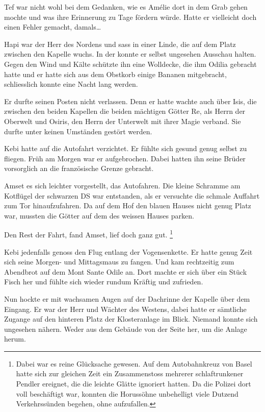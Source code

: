 Tef war nicht wohl bei dem Gedanken, wie es Amélie dort in dem Grab gehen mochte und was ihre Erinnerung zu Tage fördern würde. Hatte er vielleicht doch einen Fehler gemacht, damals\dots 

Hapi war der Herr des Nordens und sass in einer Linde, die auf dem Platz zwischen den Kapelle wuchs. In der konnte er selbst ungesehen Ausschau halten. Gegen den Wind und Kälte schützte ihn eine Wolldecke, die ihm Odilia gebracht hatte und er hatte sich aus dem Obstkorb einige Bananen mitgebracht, schliesslich konnte eine Nacht lang werden.

Er durfte seinen Posten nicht verlassen. Denn er hatte wachte auch über Isis, die zwischen den beiden Kapellen die beiden mächtigen Götter Re, als Herrn der Oberwelt und Osiris, den Herrn der Unterwelt mit ihrer Magie verband. Sie durfte unter keinen Umständen gestört werden.

Kebi hatte auf die Autofahrt verzichtet. Er fühlte sich gesund genug selbst zu fliegen. Früh am Morgen war er aufgebrochen. Dabei hatten ihn seine Brüder vorsorglich an die französische Grenze gebracht. 

Amset es sich leichter vorgestellt, das Autofahren. Die kleine Schramme am Kotflügel der schwarzen DS war entstanden, als er versuchte die schmale Auffahrt zum Tor hinaufzufahren. Da auf dem Hof den blauen Hauses nicht genug Platz war, mussten die Götter auf dem des weissen Hauses parken.

Den Rest der Fahrt, fand Amset, lief doch ganz gut. \footnote{Dabei war es reine Glücksache gewesen. Auf dem Autobahnkreuz von Basel hatte sich zur gleichen Zeit ein Zusammenstoss mehrerer schlaftrunkener Pendler ereignet, die die leichte Glätte ignoriert hatten. Da die Polizei dort voll beschäftigt war, konnten die Horussöhne unbehelligt viele Dutzend Verkehrssünden begehen, ohne aufzufallen.}

Kebi jedenfalls genoss den Flug entlang der Vogensenkette. Er hatte genug Zeit sich seine Morgen- und Mittagsmaus zu fangen. Und kam rechtzeitig zum Abendbrot auf dem Mont Sante Odile an. Dort machte er sich über ein Stück Fisch her und fühlte sich wieder rundum Kräftig und zufrieden.

Nun hockte er mit wachsamen Augen auf der Dachrinne der Kapelle über dem Eingang. Er war der Herr und Wächter des Westens, dabei hatte er sämtliche Zugange auf den hinteren Platz der Klosteranlage im Blick. Niemand konnte sich ungesehen nähern. Weder aus dem Gebäude von der Seite her, um die Anlage herum.

